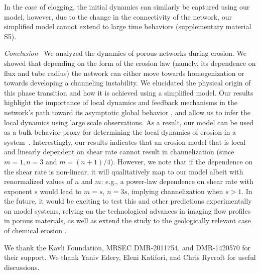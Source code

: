 \documentclass[%
reprint,
 amsmath,amssymb,
 aps,
prl,
]{revtex4-1}
\begin{document}
In the case of clogging, the initial dynamics can similarly be captured using our model, however, due to the change in the connectivity of the network, our simplified model cannot extend to large time behaviors (supplementary material S5).
 

%
\textit{Conclusion}-- {We analyzed the dynamics of porous networks during erosion.  We showed that depending on the form of the erosion law (namely, its dependence on flux and tube radius) the network can either move towards homogenization or towards developing a channeling instability.  We elucidated the physical origin of this phase transition and how it is achieved using a simplified model. Our results highlight the importance of local dynamics and feedback mechanisms in the network's path toward its asymptotic global behavior \cite{ronellenfitsch2016global,corson2010fluctuations,katifori2010damage,hu2013adaptation,ocko2015feedback},  and allow us to infer the local dynamics using large scale observations. As a result, our model can be used as a bulk behavior proxy for determining the local dynamics of erosion in a system~\cite{mahadevan2012flow}. Interestingly, our results indicates that an erosion model that is local and linearly dependent on shear rate cannot result in channelization (since $m=1,n=3$ and $m=(n+1)/4$). However, we note that if the dependence on the shear rate is non-linear, it will qualitatively map to our model albeit with renormalized values of $n$ and $m$: e.g., a power-law dependence on shear rate with exponent $s$ would lead to $m =s$, $n = 3 s$, implying channelization when $s>1$. In the future, it would be exciting to test this and other predictions experimentally on model systems, relying on the technological advances in imaging flow profiles in porous materials, as well as extend the study to the geologically relevant case of chemical erosion \cite{edery2014origins,edery2016characterization}. 
}



\begin{acknowledgments}
We thank the Kavli Foundation, MRSEC  DMR-2011754, and DMR-1420570 for their support. We thank Yaniv Edery,  Eleni Katifori, and Chris Rycroft
for useful discussions.
\end{acknowledgments}



\appendix

\newpage
\onecolumngrid



\renewcommand{\thepage}{S\arabic{page}}
\setcounter{page}{1}
\renewcommand{\thesection}{S\arabic{section}}
\setcounter{section}{0}
\renewcommand{\thetable}{S\arabic{table}}
\renewcommand{\thefigure}{S\arabic{figure}}
\setcounter{figure}{0}
\renewcommand{\theequation}{S\arabic{equation}}
\setcounter{equation}{0}
\def\lp{\left(}
\def\rp{\right)}
\def\lb{\left[}
\def\rb{\right]}
\end{document}
